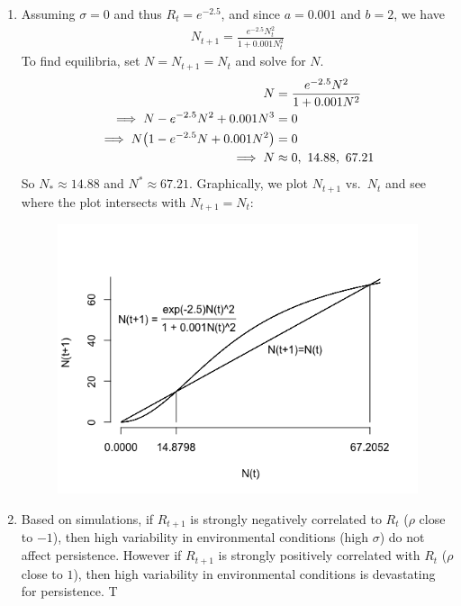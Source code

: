 \documentclass{article} %
\theoremstyle{plain}
\numberwithin{equation}{section} %
\numberwithin{figure}{section} %
\numberwithin{table}{section} %
\begin{document}
\begin{enumerate}[\ \ (a)]
    \item
        Assuming $\sigma = 0$ and thus $R_t = e^{-2.5}$, and since $a = 0.001$ and $b = 2$, we have
        \begin{align}
            N_{t+1} = \frac{e^{-2.5} N_t^2}{1 + 0.001N_t^2}
        \end{align}
        To find equilibria, set $N = N_{t+1} = N_t$ and solve for $N$.
        \begin{align}
            N &= \frac{e^{-2.5}N^2}{1 + 0.001N^2} \\
            \implies N - e^{-2.5}N^2 + 0.001N^3 &= 0 \\
            \implies N\qty(1 - e^{-2.5}N + 0.001N^2) &= 0 \\
            \implies N &\approx 0,\ 14.88,\ 67.21
        \end{align}
        So $N_* \approx 14.88$ and $N^* \approx 67.21$.  Graphically, we plot $N_{t+1}$ vs.~$N_t$ and see where the plot intersects with $N_{t+1} = N_{t}$:
        \begin{figure}[ht!]
            \centering
            \includegraphics[scale=0.5]{figure_3a.png}
        \end{figure}
        \FloatBarrier
    \item
        Based on simulations, if $R_{t+1}$ is strongly negatively correlated to $R_t$ ($\rho$ close to $-1$), then high variability in environmental conditions (high $\sigma$) do not affect persistence.  However if $R_{t+1}$ is strongly positively correlated with $R_t$ ($\rho$ close to $1$), then high variability in environmental conditions is devastating for persistence. T

\end{enumerate}
\end{document}
